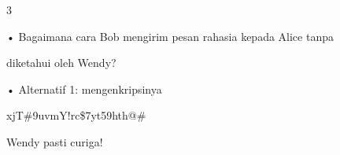 \documentclass{article}
\begin{document}

3

• Bagaimana cara Bob mengirim pesan rahasia kepada Alice tanpa 

diketahui oleh Wendy?

• Alternatif 1: mengenkripsinya


   xjT\#9uvmY!rc\$7yt59hth@\#

 Wendy pasti curiga!
\end{document}
